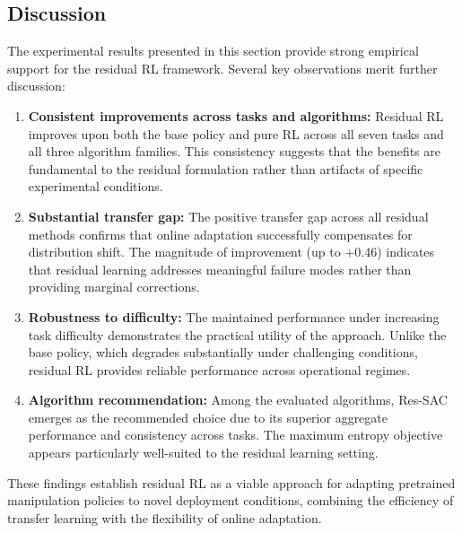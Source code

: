 \subsection{Discussion}
\label{sec:results:discussion}

The experimental results presented in this section provide strong empirical support for the residual \ac{RL} framework. Several key observations merit further discussion:

\begin{enumerate}
    \item \textbf{Consistent improvements across tasks and algorithms:} Residual \ac{RL} improves upon both the base policy and pure \ac{RL} across all seven tasks and all three algorithm families. This consistency suggests that the benefits are fundamental to the residual formulation rather than artifacts of specific experimental conditions.
    
    \item \textbf{Substantial transfer gap:} The positive transfer gap across all residual methods confirms that online adaptation successfully compensates for distribution shift. The magnitude of improvement (up to $+0.46$) indicates that residual learning addresses meaningful failure modes rather than providing marginal corrections.
    
    \item \textbf{Robustness to difficulty:} The maintained performance under increasing task difficulty demonstrates the practical utility of the approach. Unlike the base policy, which degrades substantially under challenging conditions, residual \ac{RL} provides reliable performance across operational regimes.
    
    \item \textbf{Algorithm recommendation:} Among the evaluated algorithms, Res-SAC emerges as the recommended choice due to its superior aggregate performance and consistency across tasks. The maximum entropy objective appears particularly well-suited to the residual learning setting.
\end{enumerate}

These findings establish residual \ac{RL} as a viable approach for adapting pretrained manipulation policies to novel deployment conditions, combining the efficiency of transfer learning with the flexibility of online adaptation.

